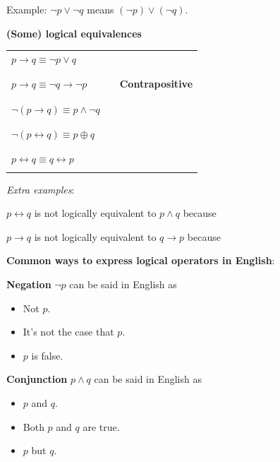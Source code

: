 \documentclass[12pt, oneside]{article}
\begin{document}
Example: $\lnot p \lor \lnot q$ means $(\lnot p) \lor (\lnot q)$.
 \newpage


{\bf (Some) logical equivalences}

\begin{tabular}{llp{3in}}
$p \to q \equiv \lnot p \lor q$ & & \\
&& \\
&& \\
$p \to q \equiv \lnot q \to \lnot p$ & &{\bf Contrapositive} \\
&& \\
&& \\
$\lnot (p \to q) \equiv p\land \lnot q$  & &\\
&& \\
&& \\
$\lnot( p \leftrightarrow q) \equiv p \oplus q$ && \\
&& \\
&& \\
$p \leftrightarrow q \equiv q \leftrightarrow p$ &&\\
&& \\
\end{tabular}

\vfill

{\it Extra examples}:

$p \leftrightarrow q$ is not logically equivalent to $p \land q$ because \underline{\phantom{\hspace{4in}}} 

$p \to q$ is not logically equivalent to $q \to p$ because \underline{\phantom{\hspace{4in}}} 
\vfill
 \newpage


{\bf Common ways to express logical operators in English}:

{\bf Negation} $\lnot p$ can be said in English as 

\vspace{-20pt}
\begin{itemize}
\item Not $p$.
\item It's not the case that $p$.
\item $p$ is false.
\end{itemize}

{\bf Conjunction} $p \land q$ can be said in English as

\vspace{-20pt}
\begin{itemize}
    \item $p$ and $q$.
    \item Both $p$ and $q$ are true.
    \item $p$ but $q$.
\end{itemize}
\end{document}
